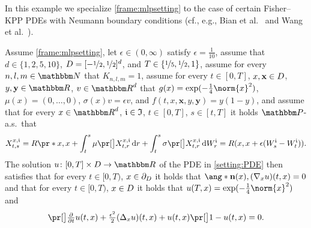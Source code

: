 \begin{example}
	\label{exampleMLP:fisherkpp_neumann}
	In this example we specialize \cref{frame:mlpsetting} to the case of certain Fisher--KPP PDEs with Neumann boundary conditions (cf., e.g., Bian et al.~\citep{Bian2017} and Wang et al.~\citep{Wang2021}).
	
	Assume 
		\cref{frame:mlpsetting},
	let
		$\epsilon\in(0,\infty)$
	satisfy
		$\epsilon = \tfrac{1}{10}$,
	assume that
		$d\in\{1,2,5,10\}$,
		$D = [-\nicefrac{1}{2},\nicefrac{1}{2}]^d$, and
		$T\in\{\nicefrac{1}{5},\nicefrac{1}{2},1\}$,
	assume 
		for every 
			$n,l,m\in \N$ 
		that
			$K_{n,l,m} = 1$,
	assume for every 
		$t \in [0,T]$,
		$x,\mathbf{x} \in D$,
		$y,\mathbf{y} \in \R$,
		$v \in \R^d$ 
	that
		$g(x)= \exp (- \tfrac{1}{4}\norm{x}^2)$,
		$\mu(x)=(0,\dots,0)$, 
		$\sigma(x) v = \epsilon v$, and
		$f(t,x,\mathbf{x},y,\mathbf{y})= y(1-y)$,
	and	assume that for every 
		$x\in \R^{d}$, 
		$\mathfrak{i} \in \mathfrak{I}$, 
		$t\in [0,T]$, 
		$s\in [t,T]$ 
	it holds $\P$-a.s.\ that
	\begin{equation}
		X^{x,\dindex}_{t,s} 
		= 
		R\pr*{x,x + \int_{t}^{s} \mu\bpr{X^{x,\dindex}_{t,r}} \, \diff r + \int^{s}_{t} \sigma \bpr{X^{x,\dindex}_{t,r}} \, \diff W^{\dindex}_{r} }
		=
		R(x,x+\epsilon(W^\dindex_s-W^\dindex_t))
		.
	\end{equation}
	The solution 
		$u\colon[0,T]\times \D \to \R$ 
	of the PDE in \eqref{setting:PDE} then satisfies that 
		for every
			$t\in [0,T)$, $x\in\partial_D$
		it holds that
			$\ang*{\mathbf{n}(x) ,(\nabla_x u)(t,x)} = 0$
		and that for every
			$t\in [0,T)$, $x\in D$
		it holds that
			$u(T,x) = \exp (- \tfrac{1}{4}\norm{x}^2)$ and
			\begin{equation}
				\label{eqMLP:fisherKPP_neumann}
				\bpr{\tfrac{\partial }{\partial t}u} (t,x) 
				+
				\tfrac{\epsilon^2}{2}(\Delta_x u) (t,x) 
				+
				u(t,x)\bpr{1 - u(t,x) }
				=
				0
				.
			\end{equation}
\end{example}

